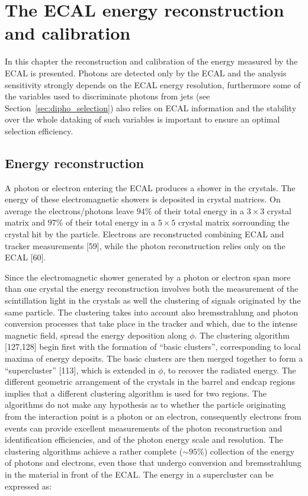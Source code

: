 \chapter{The ECAL energy reconstruction and calibration}

In this chapter the reconstruction and calibration of the energy measured by the ECAL
is presented. Photons are detected only by the ECAL and the analysis sensitivity strongly depends
on the ECAL energy resolution, furthermore some of the variables used to discriminate photons
from jets (see Section~\ref{sec:dipho_selection}) also relies on ECAL information and the stability
over the whole dataking of such variables is important to ensure an optimal selection efficiency.

\section{Energy reconstruction}
A photon or electron entering the ECAL produces a shower in the \PbWO crystals. The energy of
these electromagnetic showers is deposited in crystal matrices. On average the electrons/photons
leave $94\%$ of their total energy in a $3\times3 $ crystal matrix and $97\%$ of their total energy in a $5\times 5$
crystal matrix sorrounding the crystal hit by the particle.
Electrons are reconstructed combining ECAL and tracker measurements [59],
while the photon reconstruction relies only on the ECAL [60].

Since the electromagnetic shower generated by a photon or electron span more than one crystal the
energy reconstruction involves both the measurement of the scintillation light in the crystals as well
the clustering of signals originated by the same particle. The clustering takes into account
also bremsstrahlung and photon conversion processes that take place in the tracker and which, due to the
intense magnetic field, spread the energy deposition along $\phi$.
The clustering algorithm [127,128] begin first with the formation of
``basic clusters'', corresponding to local maxima of energy deposits. The basic clusters are then
merged together to form a ``supercluster'' [113], which is extended in $\phi$, to recover the radiated energy.
The different geometric arrangement of the crystals in the barrel and
endcap regions implies that a different clustering algorithm is used for two regions. The algorithms do not
make any hypothesis as to whether the particle originating from the interaction point is a photon
or an electron, consequently electrons from \Zee events can provide excellent measurements
of the photon reconstruction and identification efficiencies, and of the photon energy scale and
resolution. The clustering algorithms achieve a rather complete ($\sim 95\%$) collection of the energy
of photons and electrons, even those that undergo conversion and bremsstrahlung in the material
in front of the ECAL.
The energy in a supercluster can be expressed as:

